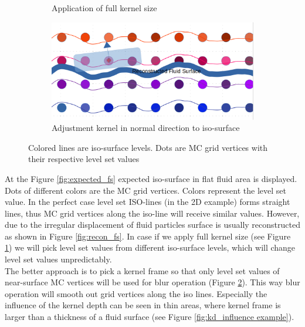 \begin{figure}[H]
\begin{subfigure}[b]{0.5\textwidth}
               \caption{Application of full kernel size}
               \label{fig:full_ks}
        \end{subfigure}
        \begin{subfigure}[b]{0.5\textwidth}
               \includegraphics[width=\textwidth]{figures/LevelSetBlurKernelPart.png}
               \caption{Adjustment kernel in normal direction to iso-surface}
				\label{fig:partial_ks}
        \end{subfigure}

       \caption{Colored lines are iso-surface levels. Dots are MC grid vertices with their respective level set values}
       \label{fig:kd_surface_explenation}
 \end{figure}
At the Figure \ref{fig:expected_fs} expected iso-surface in flat fluid area is displayed. Dots of different colors are the MC grid vertices. Colors represent the level set value. In the perfect case level set ISO-lines (in the 2D example) forms straight lines, thus MC grid vertices along the iso-line will receive similar values. However, due to the irregular displacement of fluid particles surface is usually reconstructed as shown in Figure \ref{fig:recon_fs}. In case if we apply full kernel size (see Figure \ref{fig:full_ks}) we will pick level set values from different iso-surface levels, which will change level set values unpredictably.\\
The better approach is to pick a kernel frame so that only level set values of near-surface MC vertices will be used for blur operation (Figure \ref{fig:partial_ks}). This way blur operation will smooth out grid vertices along the iso lines. Especially the influence of the kernel depth can be seen in thin areas, where kernel frame is larger than a thickness of a fluid surface (see Figure \ref{fig:kd_influence example}).
